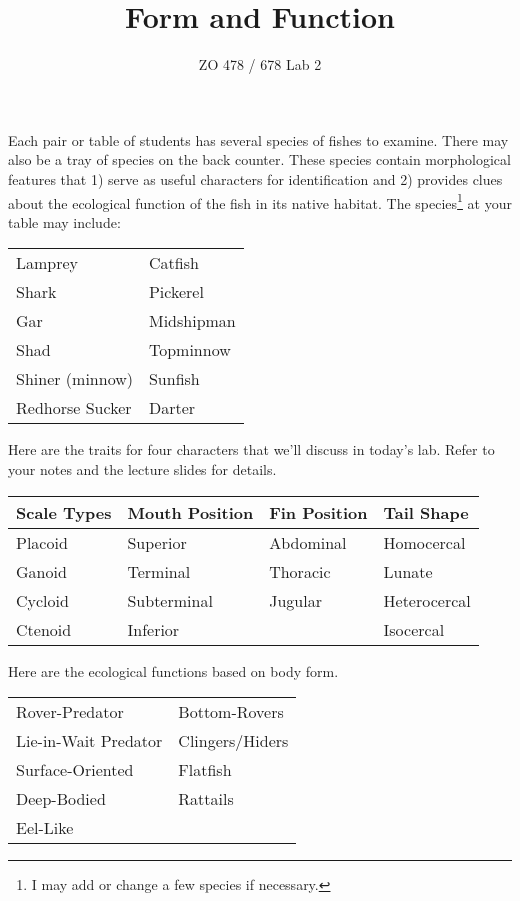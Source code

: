 \documentclass[11pt]{article}
\title{Form and Function}
\author{ZO 478 / 678 Lab 2}
\date{}                                           %
\newcommand{\VSpace}{\vspace{\baselineskip}}
\begin{document}
\maketitle

Each pair or table of students has several species of fishes to examine.  There may also be a tray of species on the back counter. These species contain morphological features that 1) serve as useful characters for identification and 2) provides clues about the ecological function of the fish in its native habitat.  The species\footnote{I may add or change a few species if necessary.} at your table may include:\VSpace

\begin{tabular}{ll}
\toprule
Lamprey 	&	Catfish\\
Shark 	&	Pickerel\\
Gar 	&	Midshipman \\
Shad 	&	Topminnow \\
Shiner (minnow)	&	Sunfish \\
Redhorse Sucker	&	Darter \\
\bottomrule
\end{tabular}

\VSpace\VSpace

Here are the traits for four characters that we’ll discuss in today’s lab. Refer to your notes and the lecture slides for details.

\VSpace

\begin{tabular}{llll}
\toprule
Scale Types	&	Mouth Position	&	Fin Position	&	Tail Shape \\
\midrule
Placoid		& 	Superior		&	Abdominal	&	Homocercal \\
Ganoid		&	Terminal		&	Thoracic		&	Lunate \\
Cycloid		&	Subterminal	&	Jugular		&	Heterocercal \\
Ctenoid		&	Inferior		&				&	Isocercal \\
\bottomrule
\end{tabular}

\VSpace\VSpace

Here are the ecological functions based on body form.\VSpace

\begin{tabular}{ll}
\toprule
Rover-Predator 	&	Bottom-Rovers \\
Lie-in-Wait Predator 	&	Clingers/Hiders \\
Surface-Oriented 	&	Flatfish \\
Deep-Bodied 		&	Rattails \\
Eel-Like 			& 	 \\
\bottomrule
\end{tabular}
\end{document}

